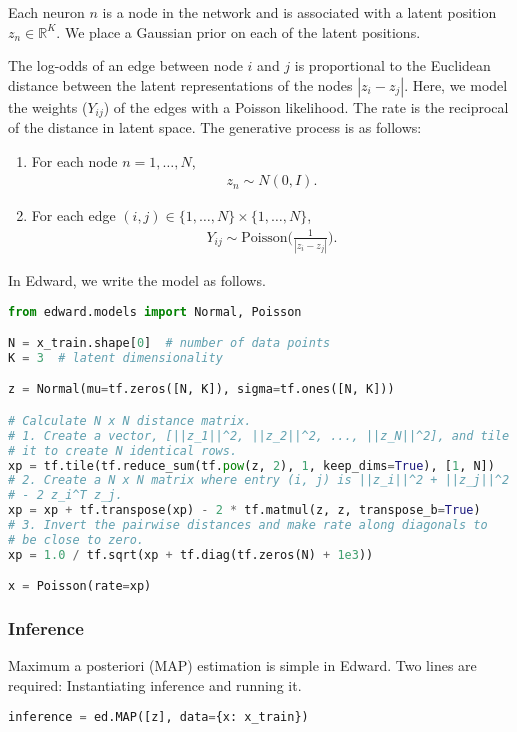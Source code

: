 Each neuron $n$ is a node in the network and is associated with a latent
position $z_n\in\mathbb{R}^K$.
We place a Gaussian prior on each of the latent positions.

The log-odds of an edge between node $i$ and
$j$ is proportional to the Euclidean distance between the latent
representations of the nodes $|z_i- z_j|$. Here, we
model the weights ($Y_{ij}$) of the edges with a Poisson likelihood.
The rate is the reciprocal of the distance in latent space. The
generative process is as follows:

\begin{enumerate}
\item
For each node $n=1,\ldots,N$,
\begin{align}
z_n \sim N(0,I).
\end{align}
\item
For each edge $(i,j)\in\{1,\ldots,N\}\times\{1,\ldots,N\}$,
\begin{align}
Y_{ij} \sim \text{Poisson}\Bigg(\frac{1}{|z_i - z_j|}\Bigg).
\end{align}
\end{enumerate}

In Edward, we write the model as follows.
\begin{lstlisting}[language=Python]
from edward.models import Normal, Poisson

N = x_train.shape[0]  # number of data points
K = 3  # latent dimensionality

z = Normal(mu=tf.zeros([N, K]), sigma=tf.ones([N, K]))

# Calculate N x N distance matrix.
# 1. Create a vector, [||z_1||^2, ||z_2||^2, ..., ||z_N||^2], and tile
# it to create N identical rows.
xp = tf.tile(tf.reduce_sum(tf.pow(z, 2), 1, keep_dims=True), [1, N])
# 2. Create a N x N matrix where entry (i, j) is ||z_i||^2 + ||z_j||^2
# - 2 z_i^T z_j.
xp = xp + tf.transpose(xp) - 2 * tf.matmul(z, z, transpose_b=True)
# 3. Invert the pairwise distances and make rate along diagonals to
# be close to zero.
xp = 1.0 / tf.sqrt(xp + tf.diag(tf.zeros(N) + 1e3))

x = Poisson(rate=xp)
\end{lstlisting}

\subsubsection{Inference}

Maximum a posteriori (MAP) estimation is simple in Edward. Two lines are
required: Instantiating inference and running it.
\begin{lstlisting}[language=Python]
inference = ed.MAP([z], data={x: x_train})
\end{lstlisting}

